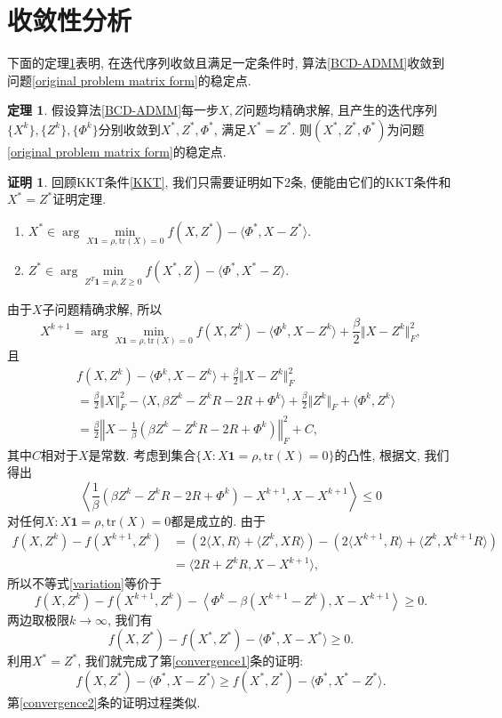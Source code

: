 \documentclass[UTF8,10.5pt,a4paper]{ctexart}
\theoremstyle{definition}
\newtheorem{thm}{定理\hspace{0.05pt}}[section]
\theoremstyle{definition}
\newtheorem*{pf}{证明}
\newcommand{\trace}{\mathrm{tr}}
\newcommand{\one}{\mathbf{1}}
\begin{document}
\section{收敛性分析}
\label{convergence analysis}
下面的定理\ref{convergence of ADMM}表明, 在迭代序列收敛且满足一定条件时, 算法\ref{BCD-ADMM}收敛到问题\eqref{original problem matrix form}的稳定点. 
\begin{thm}\label{convergence of ADMM}
	假设算法\ref{BCD-ADMM}每一步$X,Z$问题均精确求解, 且产生的迭代序列$\{X^k\},\{Z^k\},\{\Phi^k\}$分别收敛到$X^*,Z^*,\Phi^*$, 满足$X^*=Z^*$. 则$(X^*,Z^*,\Phi^*)$为问题\eqref{original problem matrix form}的稳定点.
\end{thm}
\begin{pf}
	回顾KKT条件\eqref{KKT}, 我们只需要证明如下2条, 便能由它们的KKT条件和$X^*=Z^*$证明定理. 
	\begin{enumerate}
	\item $X^*\in\arg\min\limits_{X\one=\rho,\trace(X)=0}f(X,Z^*)-\langle\Phi^*,X-Z^*\rangle.$\label{convergence1}
	\item $Z^*\in\arg\min\limits_{Z^T\one=\rho,Z\ge0}f(X^*,Z)-\langle\Phi^*,X^*-Z\rangle.$\label{convergence2}
	\end{enumerate}
	由于$X$子问题精确求解, 所以
	$$X^{k+1}=\arg\min\limits_{X\one=\rho,\trace(X)=0}f(X,Z^k)-\langle\Phi^k,X-Z^k\rangle+\frac{\beta}{2}\Vert X-Z^k\Vert_F^2,$$
	且
	$$\begin{aligned}
		&f(X,Z^k)-\langle\Phi^k,X-Z^k\rangle+\frac{\beta}{2}\Vert X-Z^k\Vert_F^2\\
		&=\frac{\beta}{2}\Vert X\Vert_F^2-\langle X,\beta Z^k-Z^kR-2R+\Phi^k\rangle+\frac{\beta}{2}\Vert Z^k\Vert_F+\langle\Phi^k,Z^k\rangle\\
		&=\frac{\beta}{2}\left\Vert X-\frac{1}{\beta}(\beta Z^k-Z^kR-2R+\Phi^k)\right\Vert_F^2+C,
	\end{aligned}$$
	其中$C$相对于$X$是常数. 考虑到集合$\{X:X\one=\rho,\trace(X)=0\}$的凸性, 根据文\cite{Rockafellar2015Convex}, 我们得出
	\begin{equation}\left\langle\frac{1}{\beta}(\beta Z^k-Z^kR-2R+\Phi^k)-X^{k+1},X-X^{k+1}\right\rangle\le0\label{variation}\end{equation}
	对任何$X:X\one=\rho,\trace(X)=0$都是成立的. 由于
	$$\begin{aligned}f(X,Z^k)-f(X^{k+1},Z^k)&=\left(2\langle X,R\rangle+\langle Z^k,XR\rangle\right)-\left(2\langle X^{k+1},R\rangle+\langle Z^k,X^{k+1}R\rangle\right)\\
	&=\langle 2R+Z^kR,X-X^{k+1}\rangle,\end{aligned}$$
	所以不等式\eqref{variation}等价于
	$$f(X,Z^k)-f(X^{k+1},Z^k)-\left\langle\Phi^k-\beta(X^{k+1}-Z^k),X-X^{k+1}\right\rangle\ge0.$$
	两边取极限$k\to\infty$, 我们有
	$$f(X,Z^*)-f(X^*,Z^*)-\langle\Phi^*,X-X^*\rangle\ge0.$$
	利用$X^*=Z^*$, 我们就完成了第\ref{convergence1}条的证明:
	$$f(X,Z^*)-\langle\Phi^*,X-Z^*\rangle\ge f(X^*,Z^*)-\langle\Phi^*,X^*-Z^*\rangle.$$
	第\ref{convergence2}条的证明过程类似. 
\end{pf}
\end{document}
